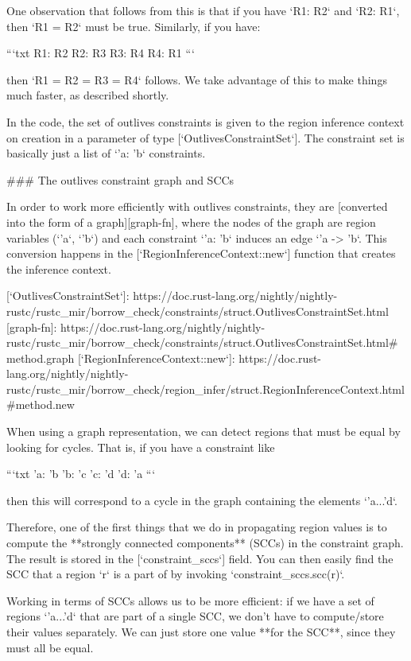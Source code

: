 \documentclass[12pt, a4paper]{article}
\begin{document}
One observation that follows from this is that if you have `R1: R2`
and `R2: R1`, then `R1 = R2` must be true. Similarly, if you have:

```txt
R1: R2
R2: R3
R3: R4
R4: R1
```

then `R1 = R2 = R3 = R4` follows. We take advantage of this to make things
much faster, as described shortly.

In the code, the set of outlives constraints is given to the region
inference context on creation in a parameter of type
[`OutlivesConstraintSet`]. The constraint set is basically just a list of `'a:
'b` constraints.

### The outlives constraint graph and SCCs

In order to work more efficiently with outlives constraints, they are
[converted into the form of a graph][graph-fn], where the nodes of the
graph are region variables (`'a`, `'b`) and each constraint `'a: 'b`
induces an edge `'a -> 'b`. This conversion happens in the
[`RegionInferenceContext::new`] function that creates the inference
context.

[`OutlivesConstraintSet`]: https://doc.rust-lang.org/nightly/nightly-rustc/rustc_mir/borrow_check/constraints/struct.OutlivesConstraintSet.html
[graph-fn]: https://doc.rust-lang.org/nightly/nightly-rustc/rustc_mir/borrow_check/constraints/struct.OutlivesConstraintSet.html#method.graph
[`RegionInferenceContext::new`]: https://doc.rust-lang.org/nightly/nightly-rustc/rustc_mir/borrow_check/region_infer/struct.RegionInferenceContext.html#method.new

When using a graph representation, we can detect regions that must be equal
by looking for cycles. That is, if you have a constraint like

```txt
'a: 'b
'b: 'c
'c: 'd
'd: 'a
```

then this will correspond to a cycle in the graph containing the
elements `'a...'d`.

Therefore, one of the first things that we do in propagating region
values is to compute the **strongly connected components** (SCCs) in
the constraint graph. The result is stored in the [`constraint_sccs`]
field. You can then easily find the SCC that a region `r` is a part of
by invoking `constraint_sccs.scc(r)`.

Working in terms of SCCs allows us to be more efficient: if we have a
set of regions `'a...'d` that are part of a single SCC, we don't have
to compute/store their values separately. We can just store one value
**for the SCC**, since they must all be equal.
\end{document}
